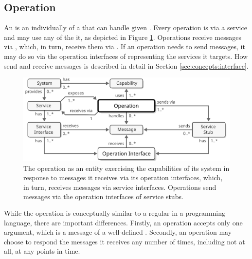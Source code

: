 \subsection{Operation}
\label{sec:concepts:operation}

An  is an individually   of a  that can handle given .
Every operation is  via a service and may use any  of the   it, as depicted in Figure \ref{fig:operation}.
Operations receive messages via , which, in turn, receive them via .
If an operation needs to send messages, it may do so via the operation interfaces of  representing the services it targets.
How  send and receive messages is described in detail in Section \ref{sec:concepts:interface}.

\begin{figure}[ht!]
  \centering
  \includegraphics[scale=0.9]{figures/operation}
  \caption{
    The operation as an entity exercising the capabilities of its system in response to messages it receives via its operation interfaces, which, in turn, receives messages via service interfaces.
    Operations send messages via the operation interfaces of service stubs.
  }
  \label{fig:operation}
\end{figure}

While the operation is conceptually similar to a regular  in a programming language, there are important differences.
Firstly, an operation accepts only one argument, which is a message of a well-defined .
Secondly, an operation may choose to respond the messages it receives any number of times, including not at all, at any points in time.

